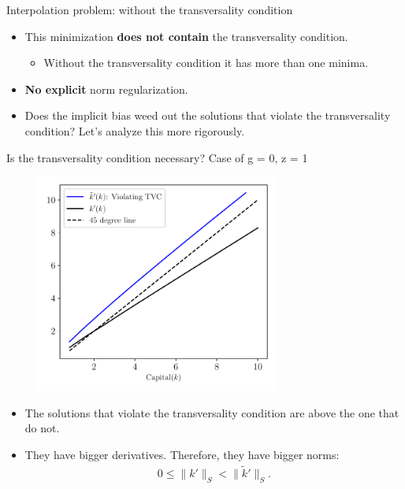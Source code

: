 \documentclass[aspectratio=169,10pt]{beamer}
\newcommand{\emphcolor}[1]{\textbf{\textcolor{emphcolorval}{#1}}}
\begin{document}
\begin{frame}{Interpolation problem: without the transversality condition}
	\begin{itemize}
		\item This minimization \emphcolor{does not contain} the transversality condition.
		\smallskip
		\begin{itemize}
			\item Without the transversality condition it has more than one minima.
		\end{itemize}
		\bigskip
		\item \emphcolor{No explicit} norm regularization.
		\bigskip
		\item Does the implicit bias weed out the solutions that violate the transversality condition? 
		\bigskip
		Let's analyze this more rigorously.
	\end{itemize}
\end{frame}


\begin{frame}{Is the transversality condition necessary? Case of g = 0, z = 1}
	\begin{figure}[htb]
		\includegraphics[width=8cm]{figs/growth_recursive_analytic_solutions.pdf}
	\end{figure}
	\begin{itemize}
		\item The solutions that violate the transversality condition are above the one that do not.
		\item They have bigger derivatives. Therefore, they have bigger norms:
		\begin{align}
			0\leq \|k'\|_S < \|\tilde{k}'\|_S.
		\end{align}
	\end{itemize}
\end{frame}
\end{document}
